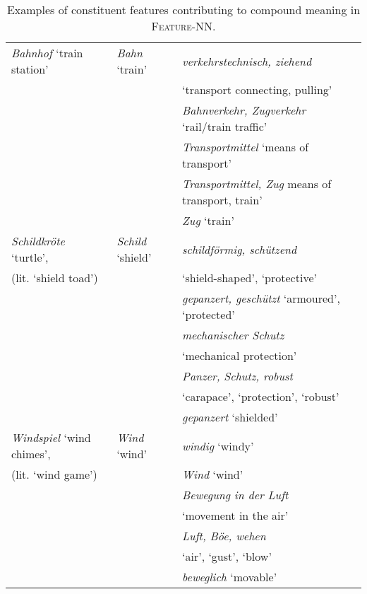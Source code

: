 \documentclass[output=paper,colorlinks,citecolor=brown]{langscibook}
\begin{document}
\begin{table}
\caption{Examples of constituent features contributing to compound meaning in \textsc{Feature-NN}.}
\label{tab:ex-features-const}
\footnotesize
  \begin{tabularx}{\textwidth}{p{3.2cm}p{2.2cm}p{7.2cm}}
  \lsptoprule

\textit{Bahnhof} `train station' & \textit{Bahn} `train' & \textit{verkehrstechnisch, ziehend}\\
& & \hspace*{+3mm} `transport connecting, pulling'\\
& &	\textit{Bahnverkehr, Zugverkehr} `rail/train traffic'\\
& &	\textit{Transportmittel} `means of transport'\\
& &	\textit{Transportmittel, Zug} means of transport, train'\\
& &	\textit{Zug} `train'\\
\midrule

\textit{Schildkröte} `turtle',  & \textit{Schild} `shield' &	\textit{schildförmig, schützend}\\
\hspace*{+6mm}(lit. `shield toad') & &	\hspace*{+3mm}`shield-shaped', `protective'\\
& &	\textit{gepanzert, geschützt} `armoured', `protected'\\
& &	\textit{mechanischer Schutz}\\
& & \hspace*{+3mm} `mechanical protection'\\
& &	\textit{Panzer, Schutz, robust}\\
& & \hspace*{+3mm}`carapace', `protection', `robust'\\
& &	\textit{gepanzert} `shielded'\\
\midrule

\textit{Windspiel} `wind chimes', & \textit{Wind} `wind' & \textit{windig} `windy'\\
\hspace*{+6mm} (lit. `wind game') & & \textit{Wind} `wind' \\
& &	\textit{Bewegung in der Luft}\\
& & \hspace*{+3mm}`movement in the air'\\
& &	\textit{Luft, Böe, wehen}\\
& & \hspace*{+3mm}`air', `gust', `blow'\\
& &	\textit{beweglich} `movable'\\
\midrule


\end{tabularx}
\end{table}
\end{document}
